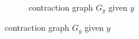\begin{center}
\begin{figure}[h]
\begin{subfigure}[t]{0.4\linewidth}
{
    }
\caption{ {contraction graph $G_y$ given $y$  }}
\label{fig:cont_b}
\end{subfigure}

\end{figure}
\end{center}
